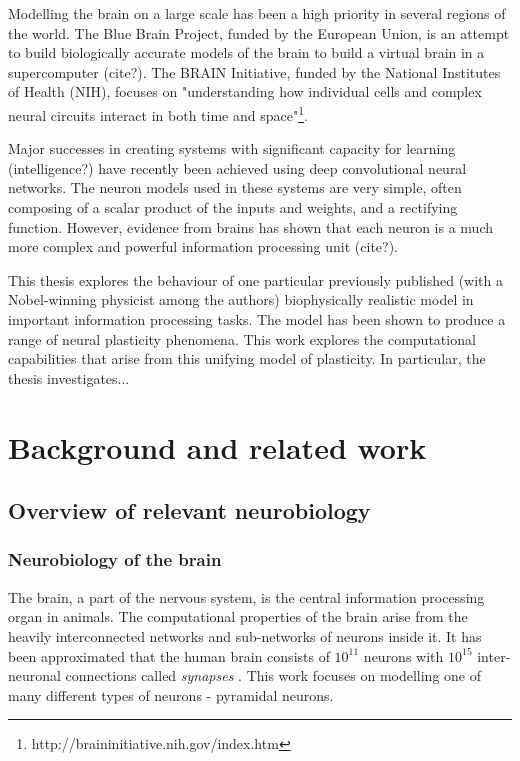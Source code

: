 \documentclass[a4paper,12pt]{report}
\theoremstyle{definition}
\begin{document}
Modelling the brain on a large scale has been a high priority in several regions of the world. The Blue Brain Project, funded by the European Union, is an attempt to build biologically accurate models of the brain to build a virtual brain in a supercomputer (cite?). The BRAIN Initiative, funded by the National Institutes of Health (NIH), focuses on "understanding how individual cells and complex neural circuits interact in both time and space"\footnote{http://braininitiative.nih.gov/index.htm}.

Major successes in creating systems with significant capacity for learning (intelligence?) have recently been achieved using deep convolutional neural networks. The neuron models used in these systems are very simple, often composing of a scalar product of the inputs and weights, and a rectifying function. However, evidence from brains has shown that each neuron is a much more complex and powerful information processing unit (cite?).

This thesis explores the behaviour of one particular previously published (with a Nobel-winning physicist among the authors) biophysically realistic model in important information processing tasks. The model has been shown to produce a range of neural plasticity phenomena. This work explores the computational capabilities that arise from this unifying model of plasticity. In particular, the thesis investigates...



\chapter{Background and related work}


\section{Overview of relevant neurobiology}

\subsection{Neurobiology of the brain}
The brain, a part of the nervous system, is the central information processing organ in animals. The computational properties of the brain arise from the heavily interconnected networks and sub-networks of neurons inside it. It has been approximated that the human brain consists of $10^{11}$ neurons with $10^{15}$ inter-neuronal connections called \emph{synapses} \cite{herculano2009human}. This work focuses on modelling one of many different types of neurons - pyramidal neurons.
\end{document}

